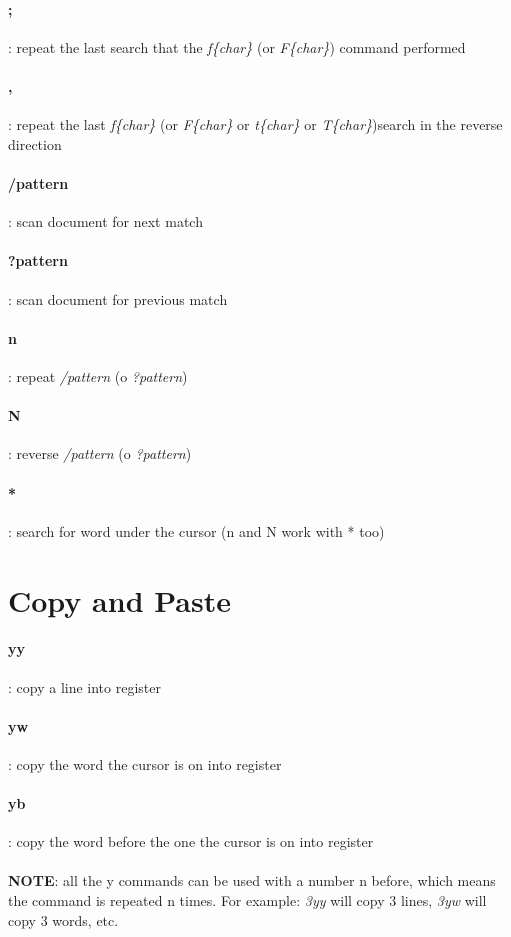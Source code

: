 \documentclass[10pt,letterpaper]{book}
\begin{document}
\paragraph{;}: repeat the last search that the \textit{f\{char\}} (or \textit{F\{char\}}) command performed
\paragraph{,}: repeat the last \textit{f\{char\}} (or \textit{F\{char\}} or \textit{t\{char\}} or \textit{T\{char\}})search in the reverse direction
\paragraph{/pattern}: scan document for next match
\paragraph{?pattern}: scan document for previous match
\paragraph{n}: repeat \textit{/pattern} (o \textit{?pattern})
\paragraph{N}: reverse \textit{/pattern} (o \textit{?pattern})
\paragraph{*}: search for word under the cursor (n and N work with * too)
\section{Copy and Paste}
\paragraph{yy}: copy a line into register
\paragraph{yw}: copy the word the cursor is on into register
\paragraph{yb}: copy the word before the one the cursor is on into register\\ \\
\textbf{NOTE}: all the y commands can be used with a number n before, which means the command is repeated n times. For example: \textit{3yy} will copy 3 lines, \textit{3yw} will copy 3 words, etc.
\end{document}
